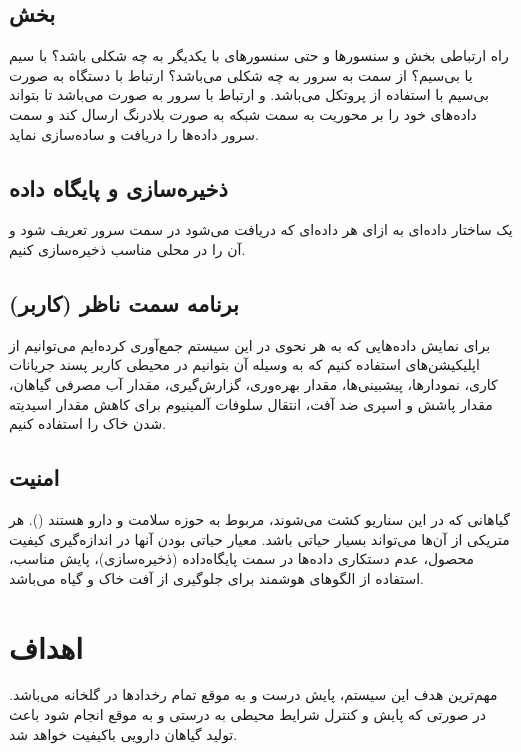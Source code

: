 \documentclass[a4paper]{report}
\begin{document}
\subsection*{بخش‌ }

راه ارتباطی بخش  و سنسور‌ها و حتی سنسور‌های با یکدیگر به چه شکلی
باشد؟ با سیم یا بی‌سیم؟ از سمت  به سرور به چه شکلی می‌باشد؟
ارتباط با دستگاه  به صورت بی‌سیم با استفاده از پروتکل
 می‌باشد. و ارتباط  با سرور به صورت  می‌باشد تا بتواند داده‌های خود را بر محوریت  به سمت شبکه به صورت
بلادرنگ ارسال کند و سمت سرور داده‌ها را دریافت و ساده‌سازی نماید.

\subsection*{ذخیره‌سازی و پایگاه داده}

یک ساختار داده‌ای به ازای هر داده‌ای که دریافت می‌شود در سمت سرور تعریف شود و آن
را در محلی مناسب ذخیره‌سازی کنیم.

\subsection*{برنامه سمت ناظر (کاربر)}

برای نمایش داده‌هایی که به هر نحوی در این سیستم جمع‌آوری کرده‌ایم می‌توانیم از
اپلیکیشن‌های  استفاده کنیم که به وسیله آن بتوانیم در محیطی کاربر
پسند جریانات کاری، نمودار‌ها، پیشبینی‌ها، مقدار بهره‌وری، گزارش‌گیری، مقدار آب
مصرفی گیاهان، مقدار پاشش و اسپری ضد آفت، انتقال سلوفات آلمینیوم برای کاهش مقدار
اسیدیته شدن خاک را استفاده کنیم.

\subsection*{امنیت}

گیاهانی که در این سناریو کشت می‌شوند، مربوط به حوزه سلامت و دارو هستند
(). هر متریکی از آن‌ها می‌تواند بسیار حیاتی باشد. معیار
حیاتی بودن آنها در اندازه‌گیری کیفیت محصول، عدم دستکاری داده‌ها در سمت
پایگاه‌داده (ذخیره‌سازی)، پایش مناسب، استفاده از الگو‌های هوشمند برای جلوگیری از
آفت خاک و گیاه می‌باشد.

\section*{اهداف}

مهم‌ترین هدف این سیستم، پایش درست و به موقع تمام رخدادها در گلخانه می‌باشد. در
صورتی که پایش و کنترل شرایط محیطی به درستی و به موقع انجام شود باعث تولید گیاهان
دارویی باکیفیت خواهد شد.
\end{document}
